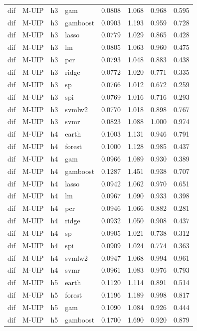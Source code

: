 \begin{ThreePartTable}
\begin{longtable}[t]{llclcccc}
dif & M-UIP & h3 & gam & 0.0808 & 1.068 & 0.968 & 0.595\\
dif & M-UIP & h3 & gamboost & 0.0903 & 1.193 & 0.959 & 0.728\\
dif & M-UIP & h3 & lasso & 0.0779 & 1.029 & 0.865 & 0.428\\
dif & M-UIP & h3 & lm & 0.0805 & 1.063 & 0.960 & 0.475\\
dif & M-UIP & h3 & pcr & 0.0793 & 1.048 & 0.883 & 0.438\\
dif & M-UIP & h3 & ridge & 0.0772 & 1.020 & 0.771 & 0.335\\
dif & M-UIP & h3 & sp & 0.0766 & 1.012 & 0.672 & 0.259\\
dif & M-UIP & h3 & spi & 0.0769 & 1.016 & 0.716 & 0.293\\
dif & M-UIP & h3 & svmlw2 & 0.0770 & 1.018 & 0.898 & 0.767\\
dif & M-UIP & h3 & svmr & 0.0823 & 1.088 & 1.000 & 0.974\\
\addlinespace
dif & M-UIP & h4 & earth & 0.1003 & 1.131 & 0.946 & 0.791\\
dif & M-UIP & h4 & forest & 0.1000 & 1.128 & 0.985 & 0.437\\
dif & M-UIP & h4 & gam & 0.0966 & 1.089 & 0.930 & 0.389\\
dif & M-UIP & h4 & gamboost & 0.1287 & 1.451 & 0.938 & 0.707\\
dif & M-UIP & h4 & lasso & 0.0942 & 1.062 & 0.970 & 0.651\\
dif & M-UIP & h4 & lm & 0.0967 & 1.090 & 0.933 & 0.398\\
dif & M-UIP & h4 & pcr & 0.0946 & 1.066 & 0.882 & 0.281\\
dif & M-UIP & h4 & ridge & 0.0932 & 1.050 & 0.908 & 0.437\\
dif & M-UIP & h4 & sp & 0.0905 & 1.021 & 0.738 & 0.312\\
dif & M-UIP & h4 & spi & 0.0909 & 1.024 & 0.774 & 0.363\\
dif & M-UIP & h4 & svmlw2 & 0.0947 & 1.068 & 0.994 & 0.961\\
dif & M-UIP & h4 & svmr & 0.0961 & 1.083 & 0.976 & 0.793\\
\addlinespace
dif & M-UIP & h5 & earth & 0.1120 & 1.114 & 0.891 & 0.514\\
dif & M-UIP & h5 & forest & 0.1196 & 1.189 & 0.998 & 0.817\\
dif & M-UIP & h5 & gam & 0.1090 & 1.084 & 0.926 & 0.444\\
dif & M-UIP & h5 & gamboost & 0.1700 & 1.690 & 0.920 & 0.879\\

\end{longtable}
\end{ThreePartTable}
